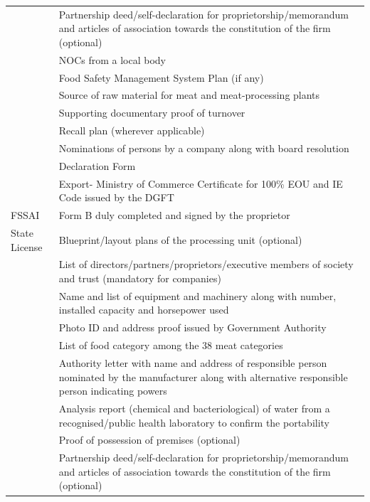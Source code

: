 \documentclass[a4paper, 12pt]{article}
\newcommand\tabitem{\makebox[1em][r]{\textbullet~}}
\begin{document}
\begin{longtable}{>{\raggedright}p{2.5cm}>{\raggedright\arraybackslash}p{13cm}}
          & \tabitem Partnership deed/self-declaration for proprietorship/memorandum and articles of association towards the constitution of the firm (optional) \\
          & \tabitem NOCs from a local body  \\
          & \tabitem Food Safety Management System Plan (if any) \\
          & \tabitem Source of raw material for meat and meat-processing plants \\
          & \tabitem Supporting documentary proof of turnover \\
          & \tabitem Recall plan (wherever applicable) \\
          & \tabitem Nominations of persons by a company along with board resolution \\
          & \tabitem Declaration Form \\
          & \tabitem Export- Ministry of Commerce Certificate for 100\% EOU and IE Code issued by the DGFT \\
    \midrule
    FSSAI & \tabitem Form B duly completed and signed by the proprietor\\
    State License & \tabitem Blueprint/layout plans of the processing unit (optional) \\
    & \tabitem List of directors/partners/proprietors/executive members of society and trust (mandatory for companies) \\
          & \tabitem Name and list of equipment and machinery along with number, installed capacity and horsepower used \\
          & \tabitem Photo ID and address proof issued by Government Authority \\
          & \tabitem List of food category among the 38 meat categories \\
          & \tabitem Authority letter with name and address of responsible person nominated by the manufacturer along with alternative responsible person indicating powers   \\
          & \tabitem Analysis report (chemical and bacteriological) of water from a recognised/public health laboratory to confirm the portability \\
          & \tabitem Proof of possession of premises (optional) \\
          & \tabitem Partnership deed/self-declaration for proprietorship/memorandum and articles of association towards the constitution of the firm (optional) \\

\end{longtable}
\end{document}
